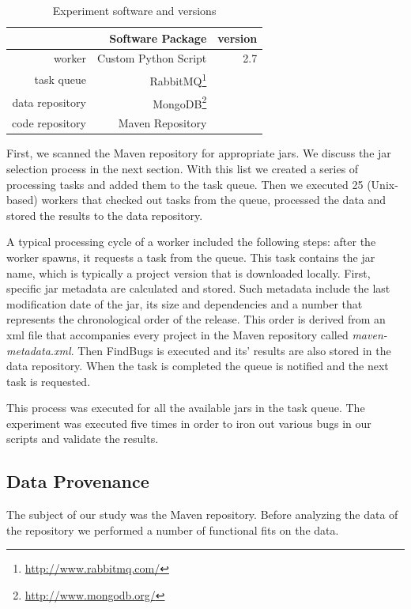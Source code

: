 \documentclass[conference]{IEEEtran}
\begin{document}
\begin{table}
\centering
\caption{Experiment software and versions}
\label{tbl:soft-version}
\begin{tabular}{r r r}
\hline
 & Software Package & version\\
 \hline
worker & Custom Python Script & 2.7\\
task queue & RabbitMQ\footnote{\url{http://www.rabbitmq.com/}} & \\
data repository & MongoDB\footnote{\url{http://www.mongodb.org/}} & \\
code repository & Maven Repository & \\
\hline
\end{tabular}
\end{table}

First, we scanned the Maven repository for appropriate {\sc jar}s.
We discuss the {\sc jar} selection process in the next 
section. With this list we created a series of processing tasks
and added them to the task queue. Then we
executed 25 (Unix-based) workers that checked out tasks from the queue,
processed the data and stored the results to the data repository.

A typical processing cycle of a worker included the following steps: after
the worker spawns, it requests a task from the queue. This task contains
the {\sc jar} name, which is typically a project version that is downloaded locally.
First, specific {\sc jar} metadata are calculated and stored. Such metadata include the
last modification date of the {\sc jar}, its size and dependencies and a number that
represents the chronological order of the release. This order is derived from an {\sc xml} file that
accompanies every project in the Maven repository called {\it
maven-metadata.xml}. Then FindBugs is executed and its' results are also stored
in the data repository. When the task is completed the queue is notified and
the next task is requested.

This process was executed for all the available {\sc jar}s in the task queue.
The experiment was executed five times in order to iron out various bugs in
our scripts and validate the results. 

\subsection{Data Provenance}
\label{sec:data}

The subject of our study was the Maven repository. Before
analyzing the data of the repository we performed a
number of functional fits on the data. 
\end{document}
